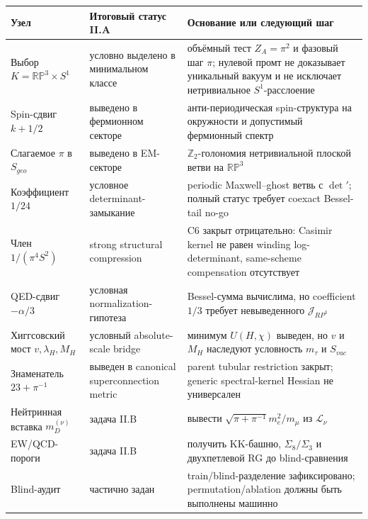 \documentclass[12pt,a4paper]{report}
\theoremstyle{remark}
\begin{document}
\begin{center}
\begin{tabular}{>{\raggedright\arraybackslash}p{}>{\raggedright\arraybackslash}p{}>{\raggedright\arraybackslash}p{}}
\toprule
Узел & Итоговый статус II.A & Основание или следующий шаг \\
\midrule
Выбор \(K=\mathbb{RP}^3\times S^1\) & условно выделено в минимальном классе & объёмный тест \(Z_A=\pi^2\) и фазовый шаг \(\pi\); нулевой промт не доказывает уникальный вакуум и не исключает нетривиальное \(S^1\)-расслоение \\
Spin-сдвиг \(k+1/2\) & выведено в фермионном секторе & анти-периодическая spin-структура на окружности и допустимый фермионный спектр \\
Слагаемое \(\pi\) в \(S_{geo}\) & выведено в EM-секторе & \(\mathbb{Z}_2\)-голономия нетривиальной плоской ветви на \(\mathbb{RP}^3\) \\
Коэффициент \(1/24\) & условное determinant-замыкание & periodic Maxwell--ghost ветвь с \(\det'\); полный статус требует coexact Bessel-tail no-go \\
Член \(1/(\pi^4S^2)\) & strong structural compression & C6 закрыт отрицательно: Casimir kernel не равен winding log-determinant, same-scheme compensation отсутствует \\
QED-сдвиг \(-\alpha/3\) & условная normalization-гипотеза & Bessel-сумма вычислима, но coefficient \(1/3\) требует невыведенного \(\mathcal J_{RP^3}\) \\
Хиггсовский мост \(v,\lambda_H,M_H\) & условный absolute-scale bridge & минимум \(U(H,\chi)\) выведен, но \(v\) и \(M_H\) наследуют условность \(m_\tau\) и \(S_{vac}\) \\
Знаменатель \(23+\pi^{-1}\) & выведен в canonical superconnection metric & parent tubular restriction закрыт; generic spectral-kernel Hessian не универсален \\
Нейтринная вставка \(m_D^{(\nu)}\) & задача II.B & вывести \(\sqrt{\pi+\pi^{-1}}m_e^2/m_\mu\) из \(\mathcal{L}_\nu\) \\
EW/QCD-пороги & задача II.B & получить KK-башню, \(\Sigma_8/\Sigma_3\) и двухпетлевой RG до blind-сравнения \\
Blind-аудит & частично задан & train/blind-разделение зафиксировано; permutation/ablation должны быть выполнены машинно \\
\bottomrule
\end{tabular}
\end{center}
\end{document}
